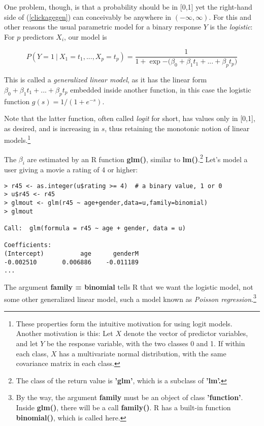 One problem, though, is that a probability should be in [0,1] yet the
right-hand side of (\ref{clickagegen}) can conceivably be anywhere in
$(-\infty,\infty)$.  For this and other reasons the usual parametric
model for a binary response $Y$ is the \textit{logistic}:  For $p$
predictors $X_i$, our model is

\begin{equation}
P(Y  = 1 ~|~ X_1=t_1,...,X_p=t_p) =
\frac{1}{1+\exp{-(\beta_0+\beta_1 t_1+...+\beta_p t_p})}
\end{equation}

This is called a \textit{generalized linear model}, as it has the linear
form $\beta_0+\beta_1 t_1+...+\beta_p t_p$ embedded inside
another function, in this case the logistic function $g(s) =
1/(1+e^{-s})$.

Note that the latter function, often called \textit{logit} for short,
has values only in [0,1], as desired, and is increasing in $s$, thus
retaining the monotonic notion of linear models.\footnote{These
properties form the intuitive motivation for using logit models.
Another motivation is this: Let $X$ denote the vector of predictor
variables, and let $Y$ be the response variable, with the two classes 0
and 1.  If within each class, $X$ has a multivariate normal
distribution, with the same covariance matrix in each class.}

The $\beta_i$ are estimated by an R function \textbf{glm()}, similar to
\textbf{lm()}.\footnote{The class of the return value is \textbf{'glm'},
which is a subclass of \textbf{'lm'.}
}
Let's model a user giving a movie a rating of 4 or
higher:

\begin{lstlisting}
> r45 <- as.integer(u$rating >= 4)  # a binary value, 1 or 0
> u$r45 <- r45
> glmout <- glm(r45 ~ age+gender,data=u,family=binomial)
> glmout

Call:  glm(formula = r45 ~ age + gender, data = u)

Coefficients:
(Intercept)          age      genderM  
-0.002510       0.006886    -0.011189  
...
\end{lstlisting}

The argument \textbf{family = binomial} tells R that we want the
logistic model, not some other generalized linear model, such a model
known as \textit{Poisson regression}.\footnote{By the way, the argument
\textbf{family} must be an object of class \textbf{'function'}.  Inside
\textbf{glm()}, there will be a call \textbf{family()}.  R has a
built-in function \textbf{binomial()}, which is called here.}

